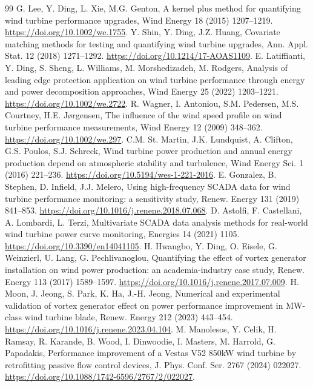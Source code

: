 \documentclass[preprint,12pt]{elsarticle}
\begin{document}
\begin{thebibliography}{99}
 G. Lee, Y. Ding, L. Xie, M.G. Genton, A kernel plus method for quantifying wind turbine performance upgrades, Wind Energy 18 (2015) 1207--1219. \url{https://doi.org/10.1002/we.1755}.
 Y. Shin, Y. Ding, J.Z. Huang, Covariate matching methods for testing and quantifying wind turbine upgrades, Ann. Appl. Stat. 12 (2018) 1271--1292. \url{https://doi.org/10.1214/17-AOAS1109}.
 E. Latiffianti, Y. Ding, S. Sheng, L. Williams, M. Morshedizadeh, M. Rodgers, Analysis of leading edge protection application on wind turbine performance through energy and power decomposition approaches, Wind Energy 25 (2022) 1203--1221. \url{https://doi.org/10.1002/we.2722}.
 R. Wagner, I. Antoniou, S.M. Pedersen, M.S. Courtney, H.E. Jørgensen, The influence of the wind speed profile on wind turbine performance measurements, Wind Energy 12 (2009) 348--362. \url{https://doi.org/10.1002/we.297}.
 C.M. St. Martin, J.K. Lundquist, A. Clifton, G.S. Poulos, S.J. Schreck, Wind turbine power production and annual energy production depend on atmospheric stability and turbulence, Wind Energy Sci. 1 (2016) 221--236. \url{https://doi.org/10.5194/wes-1-221-2016}.
 E. Gonzalez, B. Stephen, D. Infield, J.J. Melero, Using high-frequency SCADA data for wind turbine performance monitoring: a sensitivity study, Renew. Energy 131 (2019) 841--853. \url{https://doi.org/10.1016/j.renene.2018.07.068}.
 D. Astolfi, F. Castellani, A. Lombardi, L. Terzi, Multivariate SCADA data analysis methods for real-world wind turbine power curve monitoring, Energies 14 (2021) 1105. \url{https://doi.org/10.3390/en14041105}.
 H. Hwangbo, Y. Ding, O. Eisele, G. Weinzierl, U. Lang, G. Pechlivanoglou, Quantifying the effect of vortex generator installation on wind power production: an academia-industry case study, Renew. Energy 113 (2017) 1589--1597. \url{https://doi.org/10.1016/j.renene.2017.07.009}.
 H. Moon, J. Jeong, S. Park, K. Ha, J.-H. Jeong, Numerical and experimental validation of vortex generator effect on power performance improvement in MW-class wind turbine blade, Renew. Energy 212 (2023) 443--454. \url{https://doi.org/10.1016/j.renene.2023.04.104}.
 M. Manolesos, Y. Celik, H. Ramsay, R. Karande, B. Wood, I. Dinwoodie, I. Masters, M. Harrold, G. Papadakis, Performance improvement of a Vestas V52 850kW wind turbine by retrofitting passive flow control devices, J. Phys. Conf. Ser. 2767 (2024) 022027. \url{https://doi.org/10.1088/1742-6596/2767/2/022027}.

\end{thebibliography}
\end{document}
